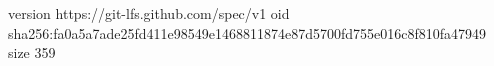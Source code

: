 version https://git-lfs.github.com/spec/v1
oid sha256:fa0a5a7ade25fd411e98549e1468811874e87d5700fd755e016c8f810fa47949
size 359
